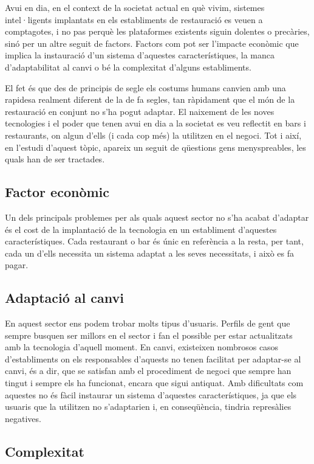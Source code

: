 Avui en dia, en el context de la societat actual en què vivim, sistemes intel·ligents implantats en els establiments de restauració es veuen a comptagotes, i no pas perquè les plataformes existents siguin dolentes o precàries, sinó per un altre seguit de factors. Factors com pot ser l'impacte econòmic que implica la instauració d'un sistema d'aquestes característiques, la manca d’adaptabilitat al canvi o bé la complexitat d'alguns establiments.

El fet és que des de principis de segle els costums humans canvien amb una rapidesa realment diferent de la de fa segles, tan ràpidament que el món de la restauració en conjunt no s'ha pogut adaptar.
El naixement de les noves tecnologies i el poder que tenen avui en dia a la societat es veu reflectit en bars i restaurants, on algun d'ells (i cada cop més) la utilitzen en el negoci.
Tot i així, en l'estudi d'aquest tòpic, apareix un seguit de qüestions gens menyspreables, les quals han de ser tractades.

\subsection{Factor econòmic}

Un dels principals problemes per als quals aquest sector no s’ha acabat d’adaptar és el cost de la implantació de la tecnologia en un establiment d’aquestes característiques. Cada restaurant o bar és únic en referència a la resta, per tant, cada un d’ells necessita un sistema adaptat a les seves necessitats, i això es fa pagar.

\subsection{Adaptació al canvi}

En aquest sector ens podem trobar molts tipus d’usuaris. Perfils de gent que sempre busquen ser millors en el sector i fan el possible per estar actualitzats amb la tecnologia d’aquell moment. 
En canvi, existeixen nombrosos casos d’establiments on els responsables d’aquests no tenen facilitat per adaptar-se al canvi, és a dir, que se satisfan amb el procediment de negoci que sempre han tingut i sempre els ha funcionat, encara que sigui antiquat. Amb dificultats com aquestes no és fàcil instaurar un sistema d’aquestes característiques, ja que els usuaris que la utilitzen no s’adaptarien i, en conseqüència, tindria represàlies negatives.

\subsection{Complexitat}

